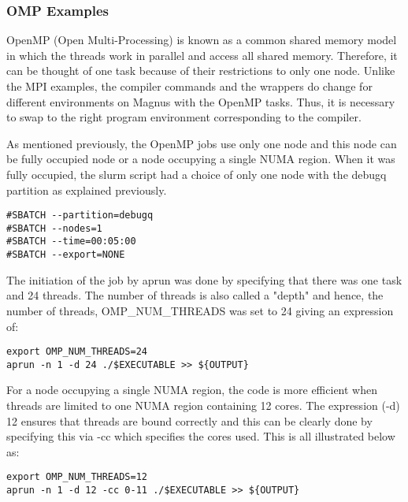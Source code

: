 \subsubsection{OMP Examples}

OpenMP (Open Multi-Processing) is known as a common shared memory model in which the threads work in parallel and access all shared memory. Therefore,
it can be thought of one task because of their restrictions to only one node. Unlike the MPI examples, the compiler commands and the wrappers do change 
for different environments on Magnus with the OpenMP tasks. Thus, it is necessary to swap to the right program environment corresponding to the compiler.

As mentioned previously, the OpenMP jobs use only one node and this node can be fully occupied node or a node occupying a single NUMA region. When it was 
fully occupied, the slurm script had a choice of only one node with the debugq partition as explained previously.

\begin{tcolorbox}
\begin{Verbatim}[fontsize=\scriptsize]
#SBATCH --partition=debugq
#SBATCH --nodes=1
#SBATCH --time=00:05:00
#SBATCH --export=NONE
\end{Verbatim}
\end{tcolorbox}

The initiation of the job by aprun was done by specifying that there was one task and 24 threads. The number of threads is also called a "depth" and 
hence, the number of threads, OMP\_NUM\_THREADS was set to 24 giving an expression of:

\begin{tcolorbox}
\begin{Verbatim}[fontsize=\scriptsize]
export OMP_NUM_THREADS=24
aprun -n 1 -d 24 ./$EXECUTABLE >> ${OUTPUT}
\end{Verbatim}
\end{tcolorbox}

For a node occupying a single NUMA region, the code is more efficient when threads are limited to one NUMA region containing 12 cores. The expression 
(-d) 12 ensures that threads are bound correctly and this can be clearly done by specifying this via -cc which specifies the cores used. This is all 
illustrated below as:

\begin{tcolorbox}
\begin{Verbatim}[fontsize=\scriptsize]
export OMP_NUM_THREADS=12
aprun -n 1 -d 12 -cc 0-11 ./$EXECUTABLE >> ${OUTPUT}
\end{Verbatim}
\end{tcolorbox}

